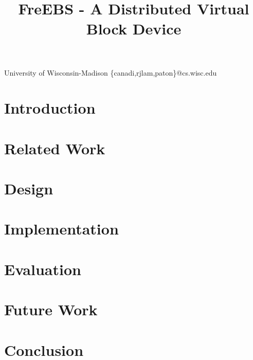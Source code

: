 \documentclass[11pt, nocopyrightspace]{sigplanconf}
\begin{document}
\title{FreEBS - A Distributed Virtual Block Device}

	{University of Wisconsin-Madison}
	{\{canadi,rjlam,paton\}@cs.wisc.edu}

\maketitle



\section{Introduction}
\label{sec:intro}


\section{Related Work}
\label{sec:related}


\section{Design}
\label{sec:design}


\section{Implementation}
\label{sec:implementation}


\section{Evaluation}
\label{sec:evaluation}


\section{Future Work}
\label{sec:future_work}


\section{Conclusion}
\label{sec:conc}




\end{document}
